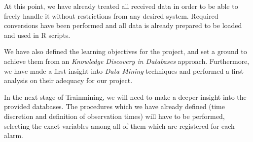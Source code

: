 At this point, we have already treated all received data in order to be able to freely handle it without restrictions from any desired system. Required conversions have been performed and all data is already prepared to be loaded and used in R scripts.

We have also defined the learning objectives for the project, and set a ground to achieve them from an \emph{Knowledge Discovery in Databases} approach. Furthermore, we have made a first insight into \emph{Data Mining} techniques and performed a first analysis on their adequacy for our project.

In the next stage of Trainmining, we will need to make a deeper insight into the provided databases. The procedures which we have already defined (time discretion and definition of observation times) will have to be performed, selecting the exact variables among all of them which are registered for each alarm.